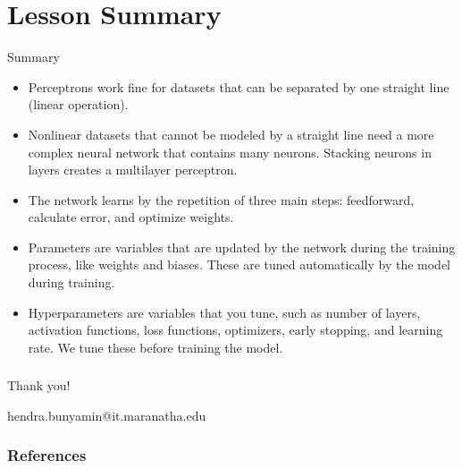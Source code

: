 \documentclass{beamer}
\begin{document}
\section{Lesson Summary}
\begin{frame}{Summary}
	\begin{itemize}
		\item<2-> Perceptrons work fine for datasets that can be separated by one straight line (linear operation). 
		\item<3-> Nonlinear datasets that cannot be modeled by a straight line need a more complex neural network that contains many neurons. Stacking neurons in layers creates a multilayer perceptron.
		\item<4-> The network learns by the repetition of three main steps: feedforward, calculate error, and optimize weights.
		\item<5-> Parameters are variables that are updated by the network during the training process, like weights and biases. These are tuned automatically by the model during training.
		\item<6-> Hyperparameters are variables that you tune, such as number of layers, activation functions, loss functions, optimizers, early stopping, and learning rate. We tune these before training the model.
	\end{itemize}
\end{frame}






\begin{frame}
    \frametitle{}
    \centering
    
    \Large\color{oxfordblue}
    Thank you!

    \vspace{0.5cm}
    hendra.bunyamin@it.maranatha.edu

\end{frame}

\begin{frame}
\frametitle{References}
\small
\end{frame}

\end{document}

